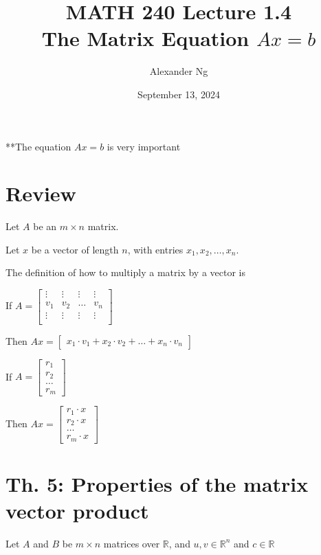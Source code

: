 \documentclass[12pt]{article}
\begin{document}
\title{MATH 240 Lecture 1.4\\The Matrix Equation $Ax=b$}
\author{Alexander Ng}
\date{September 13, 2024}

\maketitle

**The equation $Ax=b$ is very important

\section*{Review}

Let $A$ be an $m \times n$ matrix.

Let $x$ be a vector of length $n$, with entries $x_{1}, x_{2}, \dots, x_{n}$.

The definition of how to multiply a matrix by a vector is

If $
  A=\begin{bmatrix}
    \vdots & \vdots & \vdots & \vdots \\
    v_{1} & v_{2} & \dots & v_{n} \\
    \vdots & \vdots & \vdots & \vdots \\
  \end{bmatrix}
$

Then $
  Ax = \begin{bmatrix}
    x_1 \cdot v_{1} + x_2 \cdot v_{2} + \dots + x_n \cdot v_{n}
  \end{bmatrix}
$

If $
  A=\begin{bmatrix}
    r_1\\r_2\\ 
    \dots
    \\r_m
  \end{bmatrix}
$

Then $
  Ax = \begin{bmatrix}
    r_1 \cdot x\\
    r_2 \cdot x\\
    \dots\\
    r_m \cdot x
  \end{bmatrix}
$

\section{Th. 5: Properties of the matrix vector product}

Let $A$ and $B$ be $m \times n$ matrices over $\mathbb{R}$, and 
$u,v \in \mathbb{R}^{n}$ and $c\in\mathbb{R}$
\end{document}
